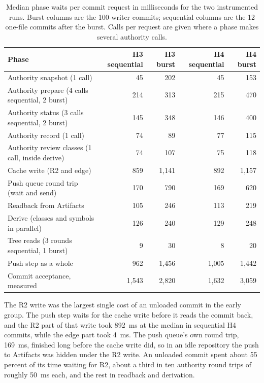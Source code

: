 \documentclass[11pt,letterpaper]{article}
\theoremstyle{definition}
\theoremstyle{remark}
\begin{document}
\begin{table}[t]
\centering
\caption{Median phase waits per commit request in milliseconds for the two instrumented runs. Burst columns are the 100-writer commits; sequential columns are the 12 one-file commits after the burst. Calls per request are given where a phase makes several authority calls.}
\label{tab:sgoc:phases}
\small
\begin{tabularx}{\textwidth}{@{}Yrrrr@{}}
\toprule
Phase & H3 sequential & H3 burst & H4 sequential & H4 burst \\
\midrule
Authority snapshot (1 call) & 45 & 202 & 45 & 153 \\ %
Authority prepare (4 calls sequential, 2 burst) & 214 & 313 & 215 & 470 \\ %
Authority status (3 calls sequential, 2 burst) & 145 & 348 & 146 & 400 \\ %
Authority record (1 call) & 74 & 89 & 77 & 115 \\ %
Authority review classes (1 call, inside derive) & 74 & 107 & 75 & 118 \\ %
Cache write (R2 and edge) & 859 & 1,141 & 892 & 1,157 \\ %
Push queue round trip (wait and send) & 170 & 790 & 169 & 620 \\ %
Readback from Artifacts & 105 & 246 & 113 & 219 \\ %
Derive (classes and symbols in parallel) & 126 & 240 & 129 & 248 \\ %
Tree reads (3 rounds sequential, 1 burst) & 9 & 30 & 8 & 20 \\ %
\midrule
Push step as a whole & 962 & 1,456 & 1,005 & 1,442 \\ %
Commit acceptance, measured & 1,543 & 2,820 & 1,632 & 3,059 \\ %
\bottomrule
\end{tabularx}
\end{table}

The R2 write was the largest single cost of an unloaded commit in the early group. The push step waits for the cache write before it reads the commit back, and the R2 part of that write took 892~ms at the median in sequential H4 commits, while the edge part took 4~ms. %
The push queue's own round trip, 169~ms, finished long before the cache write did, so in an idle repository the push to Artifacts was hidden under the R2 write. %
An unloaded commit spent about 55 percent of its time waiting for R2, about a third in ten authority round trips of roughly 50~ms each, and the rest in readback and derivation. %
\end{document}
